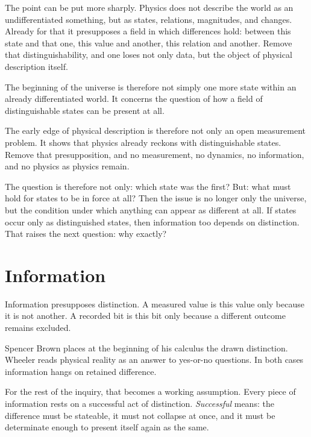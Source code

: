 \documentclass[11pt,a4paper]{book}
\begin{document}
The point can be put more sharply. Physics does not describe the world as an
undifferentiated something, but as states, relations, magnitudes, and
changes. Already for that it presupposes a field in which differences hold:
between this state and that one, this value and another, this relation and
another. Remove that distinguishability, and one loses not only data, but
the object of physical description itself.

The beginning of the universe is therefore not simply one more state within
an already differentiated world. It concerns the question of how a field of
distinguishable states can be present at all.

The early edge of physical description is therefore not only an open
measurement problem. It shows that physics already reckons with
distinguishable states. Remove that presupposition, and no measurement, no
dynamics, no information, and no physics as physics remain.

The question is therefore not only: which state was the first? But: what
must hold for states to be in force at all? Then the issue is no longer
only the universe, but the condition under which anything can appear as
different at all. If states occur only as distinguished states, then
information too depends on distinction. That raises the next question:
why exactly?

\section{Information}
\label{ch:distinction-information}

Information presupposes distinction. A measured value is this value only
because it is not another. A recorded bit is this bit only because a
different outcome remains excluded.

Spencer Brown places at the beginning of his calculus the drawn
distinction. Wheeler reads physical reality as an answer to yes-or-no
questions. In both cases information hangs on retained difference.

For the rest of the inquiry, that becomes a working assumption. Every piece
of information rests on a successful act of distinction. \emph{Successful}
means: the difference must be stateable, it must not collapse at once, and
it must be determinate enough to present itself again as the same.
\end{document}
